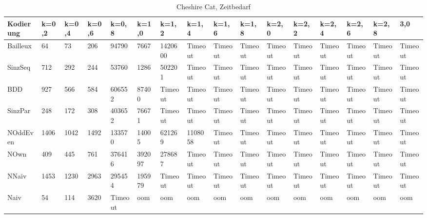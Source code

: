 \documentclass[a4,abstract=on]{scrartcl}
\begin{document}
\begin{landscape}
\begin{table}[h!]
   \end{table}

 \begin{table}[h!]
    \small
    \setlength{\tabcolsep}{0.11cm}
     \centering
     \begin{tabular}[width=\textwidth]{|l|l|l|l|l|l|l|l|l|l|l|l|l|l|l|l|}
	\hline
       \textbf{Kodierung}  & \textbf{k=0,2} & \textbf{k=0,4} & \textbf{k=0,6} &\textbf{k=0,8} &\textbf{k=1,0} &\textbf{k=1,2} &\textbf{k=1,4} &\textbf{k=1,6} &\textbf{k=1,8} &\textbf{k=2,0} &\textbf{k=2,2} &\textbf{k=2,4} &\textbf{k=2,6} &\textbf{k=2,8} & \textbf{3,0}\\
	\hline
	Bailleux & 64 & 73 & 206 & 94790 & 7667 & 1420600 & Timeout & Timeout & Timeout & Timeout & Timeout & Timeout & Timeout & Timeout & Timeout\\
\hline
	SinzSeq & 712 & 292 & 244 & 53760 & 1286 & 502201 & Timeout & Timeout & Timeout & Timeout & Timeout & Timeout & Timeout & Timeout & Timeout \\
\hline
	BDD & 927 & 566 & 584 & 606552 & 87400 & Timeout & Timeout &Timeout &Timeout &Timeout & Timeout & Timeout & Timeout & Timeout & Timeout\\
\hline
	SinzPar & 248 & 172 & 308 & 403652 & 76671 & Timeout & Timeout & Timeout & Timeout & Timeout & Timeout & Timeout & Timeout & Timeout & Timeout \\
\hline
	NOddEven & 1406 & 1042 & 1492 & 133570 & 14005 & 621269 & 1108058 & Timeout & Timeout & Timeout& Timeout & Timeout & Timeout & Timeout & Timeout\\
\hline
	NOwn & 409 & 445 & 761 & 376416 & 392097 & 278687 & Timeout & Timeout & Timeout & Timeout & Timeout & Timeout &Timeout & Timeout & Timeout\\
 \hline
	NNaiv & 1453 & 1230 & 2963 & 295454 & 195979 & Timeout & Timeout & Timeout & Timeout & Timeout & Timeout & Timeout & Timeout & Timeout & Timeout\\
\hline
	Naiv & 54 & 114 &  3620 &  Timeout &  oom &  oom &  oom &  oom &  oom &  oom &  oom &  oom &  oom &  oom & oom\\
\hline
       
     \end{tabular}

     \caption{Cheshire Cat, Zeitbedarf}
     \label{tbl:beispieltabelle}

   \end{table}


\end{landscape}
\end{document}
